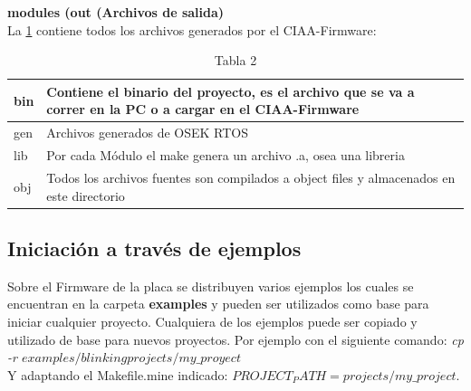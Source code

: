 \documentclass[12pt,letterpaper]{article}
\begin{document}
{\textbf{modules (out (Archivos de salida)}\\
La \ref{Tab2} contiene todos los archivos generados por el CIAA-Firmware:\\

\begin{table}[h]
\begin{center}
\begin{tabular}{|l|l|}
\hline\hline
bin & Contiene el binario del proyecto, es el archivo que se va a correr en la PC o a cargar en el CIAA-Firmware\\ \hline
gen & Archivos generados de OSEK RTOS\\ \hline
lib & Por cada Módulo el make genera un archivo .a, osea una libreria\\ \hline
obj & Todos los archivos fuentes son compilados a object files y almacenados en este directorio\\ \hline
\end{tabular}
\caption{Tabla 2}
\label{Tab2}
\end{center}
\end{table}

}
\subsection{Iniciación a través de ejemplos}
Sobre el Firmware de la placa se distribuyen varios ejemplos los cuales se encuentran en la carpeta \textbf{examples} y pueden ser utilizados como base para iniciar cualquier proyecto.
Cualquiera de los ejemplos puede ser copiado y utilizado de base para nuevos proyectos. Por ejemplo con el siguiente comando:	\textit{cp -r $examples/blinking projects/my\_proyect$}\\
Y adaptando el Makefile.mine indicado: $PROJECT_PATH = projects/my\_project$.
\end{document}
